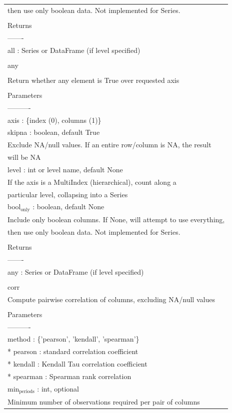 \documentclass[11pt]{article}
\begin{document}
\begin{enumerate}
\begin{enumerate}
\begin{enumerate}
\begin{center}
\begin{tabular}{l}
then use only boolean data. Not implemented for Series.\\
\\
Returns\\
-------\\
all : Series or DataFrame (if level specified)\\
\\
any\\
\\
Return whether any element is True over requested axis\\
\\
Parameters\\
----------\\
axis : \{index (0), columns (1)\}\\
skipna : boolean, default True\\
Exclude NA/null values. If an entire row/column is NA, the result\\
will be NA\\
level : int or level name, default None\\
If the axis is a MultiIndex (hierarchical), count along a\\
particular level, collapsing into a Series\\
bool\(_{\text{only}}\) : boolean, default None\\
Include only boolean columns. If None, will attempt to use everything,\\
then use only boolean data. Not implemented for Series.\\
\\
Returns\\
-------\\
any : Series or DataFrame (if level specified)\\
\\
corr\\
Compute pairwise correlation of columns, excluding NA/null values\\
\\
Parameters\\
----------\\
method : \{'pearson', 'kendall', 'spearman'\}\\
* pearson : standard correlation coefficient\\
* kendall : Kendall Tau correlation coefficient\\
* spearman : Spearman rank correlation\\
min\(_{\text{periods}}\) : int, optional\\
Minimum number of observations required per pair of columns\\

\end{tabular}
\end{center}
\end{enumerate}
\end{enumerate}
\end{enumerate}
\end{document}
